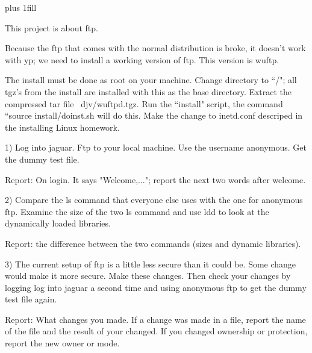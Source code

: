 
\rightskip=0pt plus 1fill

\parindent 0pt

This project is about ftp.

Because the ftp that comes with the normal distribution is broke,
it doesn't work with yp; we need to install a working version of
ftp. This version is wuftp.

The install must be done as root on your machine.
Change directory to ``{\ltt{}/}"; all tgz's from the install
are installed with this as the base directory.
Extract the compressed tar file {\ltt{}~djv/wuftpd.tgz}.
Run the ``install" script, the command ``{\ltt{}source install/doinst.sh}
will do this.
Make the change to {\ltt{}inetd.conf} descriped in the installing Linux
homework.

1) Log into jaguar.
Ftp to your local machine.
Use the username anonymous.
Get the dummy test file.

Report: On login. It says "Welcome,...";
report the next two words after welcome.

2) Compare the {\ltt{}ls} command that everyone else uses with the
one for anonymous ftp.
Examine the size of the two ls command
and use {\ltt{}ldd} to look at the dynamically loaded libraries.

Report: the difference between the two commands (sizes and dynamic libraries).

3) The current setup of ftp is a little less secure than it
could be.
Some change would make it more secure.
Make these changes.
Then check your changes by logging log into jaguar a second time
and using anonymous ftp to get the dummy test file again.

Report: What changes you made.
If a change was made in a file, report the name of the file and
the result of your changed.
If you changed ownership or protection, report the new owner or mode.
\bye
